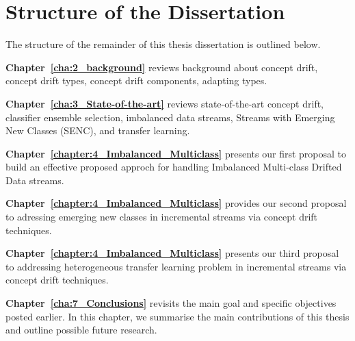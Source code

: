 
\section{Structure of the Dissertation}
\label{sec:1_introduction_organizations}
The structure of the remainder of this thesis dissertation is outlined below.
\begin{description}	
	\item \textbf{Chapter~\ref{cha:2_background}} reviews background about concept drift, concept drift types, concept drift components, adapting types.  
	
	\item \textbf{Chapter~\ref{cha:3_State-of-the-art}} reviews state-of-the-art  concept drift, classifier ensemble selection, imbalanced data streams, Streams with Emerging New Classes (SENC), and transfer learning.  
	
	\item \textbf{Chapter~\ref{chapter:4_Imbalanced_Multiclass}
	} presents our first proposal to build an effective proposed approch for  handling Imbalanced Multi-class Drifted Data streams.
	
	\item \textbf{Chapter~\ref{chapter:4_Imbalanced_Multiclass}} provides our second proposal to adressing emerging new classes in incremental streams via concept drift techniques. 
	
	\item \textbf{Chapter~\ref{chapter:4_Imbalanced_Multiclass}} presents our third proposal to addressing heterogeneous transfer learning problem  in incremental streams via concept drift techniques.
	
	\item \textbf{Chapter~\ref{cha:7_Conclusions}} revisits the main goal and specific objectives posted earlier. In this chapter, we summarise the main contributions of this thesis and outline possible future research.


\end{description}